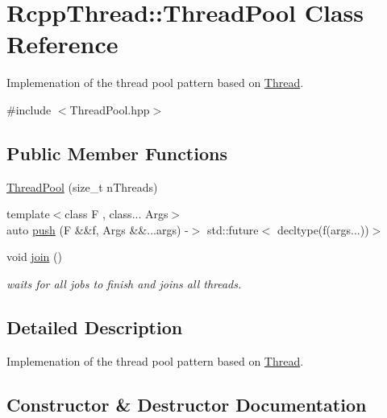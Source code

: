 \hypertarget{class_rcpp_thread_1_1_thread_pool}{}\section{Rcpp\+Thread\+:\+:Thread\+Pool Class Reference}
\label{class_rcpp_thread_1_1_thread_pool}


Implemenation of the thread pool pattern based on {\ttfamily \hyperlink{class_rcpp_thread_1_1_thread}{Thread}}.  




{\ttfamily \#include $<$Thread\+Pool.\+hpp$>$}

\subsection*{Public Member Functions}
\begin{DoxyCompactItemize}
\item 
\hyperlink{class_rcpp_thread_1_1_thread_pool_a4526bfec0fe5afb4f0533d551c0b804d}{Thread\+Pool} (size\+\_\+t n\+Threads)
\item 
{\footnotesize template$<$class F , class... Args$>$ }\\auto \hyperlink{class_rcpp_thread_1_1_thread_pool_a37abc7774539bf217d307de601ce0d79}{push} (F \&\&f, Args \&\&...args) -\/$>$ std\+::future$<$ decltype(f(args...))$>$
\item 
void \hyperlink{class_rcpp_thread_1_1_thread_pool_a1ba95e4fe30c81e19c7980c865a8ce86}{join} ()\hypertarget{class_rcpp_thread_1_1_thread_pool_a1ba95e4fe30c81e19c7980c865a8ce86}{}\label{class_rcpp_thread_1_1_thread_pool_a1ba95e4fe30c81e19c7980c865a8ce86}

\begin{DoxyCompactList}\small\item\em waits for all jobs to finish and joins all threads. \end{DoxyCompactList}\end{DoxyCompactItemize}


\subsection{Detailed Description}
Implemenation of the thread pool pattern based on {\ttfamily \hyperlink{class_rcpp_thread_1_1_thread}{Thread}}. 

\subsection{Constructor \& Destructor Documentation}

